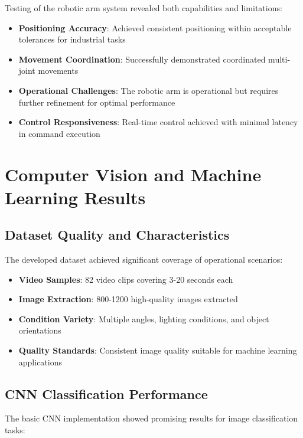 \documentclass{book}
\begin{document}
\par\noindent Testing of the robotic arm system revealed both capabilities and limitations:

\begin{itemize}
\item \textbf{Positioning Accuracy}: Achieved consistent positioning within acceptable tolerances for industrial tasks
\item \textbf{Movement Coordination}: Successfully demonstrated coordinated multi-joint movements
\item \textbf{Operational Challenges}: The robotic arm is operational but requires further refinement for optimal performance
\item \textbf{Control Responsiveness}: Real-time control achieved with minimal latency in command execution
\end{itemize}

\section{Computer Vision and Machine Learning Results}

\subsection{Dataset Quality and Characteristics}

\par\noindent The developed dataset achieved significant coverage of operational scenarios:

\begin{itemize}
\item \textbf{Video Samples}: 82 video clips covering 3-20 seconds each
\item \textbf{Image Extraction}: 800-1200 high-quality images extracted
\item \textbf{Condition Variety}: Multiple angles, lighting conditions, and object orientations
\item \textbf{Quality Standards}: Consistent image quality suitable for machine learning applications
\end{itemize}

\subsection{CNN Classification Performance}

\par\noindent The basic CNN implementation showed promising results for image classification tasks:
\end{document}
